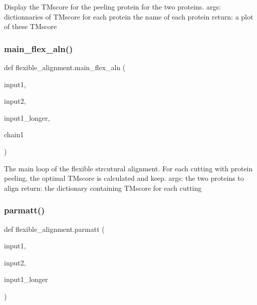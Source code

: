 \begin{DoxyVerb}Display the TMscore for the peeling protein for the two proteins.
args:
    dictionnaries of TMscore for each protein
    the name of each protein
return:
    a plot of these TMscore
\end{DoxyVerb}
 \mbox{\label{namespaceflexible__alignment_a8f26535b144e909c60f6ac3cfc0b3a15}} 
\subsubsection{\texorpdfstring{main\+\_\+flex\+\_\+aln()}{main\_flex\_aln()}}
{\footnotesize\ttfamily def flexible\+\_\+alignment.\+main\+\_\+flex\+\_\+aln (\begin{DoxyParamCaption}\item[{}]{input1,  }\item[{}]{input2,  }\item[{}]{input1\+\_\+longer,  }\item[{}]{chain1 }\end{DoxyParamCaption})}

\begin{DoxyVerb}The main loop of the flexible strcutural alignment. For each cutting with
protein peeling, the optimal TMscore is calculated and keep.
args:
    the two proteins to align
return:
    the dictionary containing TMscore for each cutting
\end{DoxyVerb}
 \mbox{\label{namespaceflexible__alignment_a5a10eda9f2b9c977b68953c2658424e3}} 
\subsubsection{\texorpdfstring{parmatt()}{parmatt()}}
{\footnotesize\ttfamily def flexible\+\_\+alignment.\+parmatt (\begin{DoxyParamCaption}\item[{}]{input1,  }\item[{}]{input2,  }\item[{}]{input1\+\_\+longer }\end{DoxyParamCaption})}

